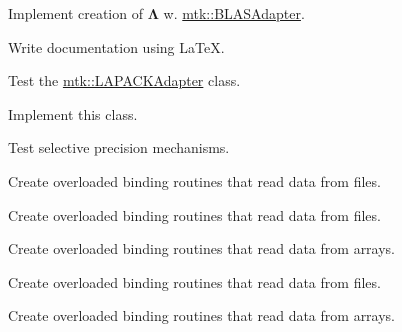 \begin{DoxyRefList}
Implement creation of $ \mathbf{\Lambda}$ w. \hyperlink{classmtk_1_1BLASAdapter}{mtk\+::\+B\+L\+A\+S\+Adapter}.  
\item[\label{todo__todo000026}%
\hypertarget{todo__todo000026}{}%
File \hyperlink{mtk__lapack__adapter_8cc}{mtk\+\_\+lapack\+\_\+adapter.cc} ]Write documentation using La\+Te\+X. 
\item[\label{todo__todo000034}%
\hypertarget{todo__todo000034}{}%
File \hyperlink{mtk__lapack__adapter__test_8cc}{mtk\+\_\+lapack\+\_\+adapter\+\_\+test.cc} ]Test the \hyperlink{classmtk_1_1LAPACKAdapter}{mtk\+::\+L\+A\+P\+A\+C\+K\+Adapter} class.  
\item[\label{todo__todo000003}%
\hypertarget{todo__todo000003}{}%
File \hyperlink{mtk__quad__1d_8h}{mtk\+\_\+quad\+\_\+1d.h} ]Implement this class.  
\item[\label{todo__todo000004}%
\hypertarget{todo__todo000004}{}%
File \hyperlink{mtk__roots_8h}{mtk\+\_\+roots.h} ]Test selective precision mechanisms.  
\item[\label{todo__todo000005}%
\hypertarget{todo__todo000005}{}%
File \hyperlink{mtk__uni__stg__grid__1d_8h}{mtk\+\_\+uni\+\_\+stg\+\_\+grid\+\_\+1d.h} ]Create overloaded binding routines that read data from files.  
\item[\label{todo__todo000008}%
\hypertarget{todo__todo000008}{}%
File \hyperlink{mtk__uni__stg__grid__2d_8h}{mtk\+\_\+uni\+\_\+stg\+\_\+grid\+\_\+2d.h} ]Create overloaded binding routines that read data from files.

Create overloaded binding routines that read data from arrays.  
\item[\label{todo__todo000012}%
\hypertarget{todo__todo000012}{}%
File \hyperlink{mtk__uni__stg__grid__3d_8h}{mtk\+\_\+uni\+\_\+stg\+\_\+grid\+\_\+3d.h} ]Create overloaded binding routines that read data from files.

Create overloaded binding routines that read data from arrays. 
\end{DoxyRefList}